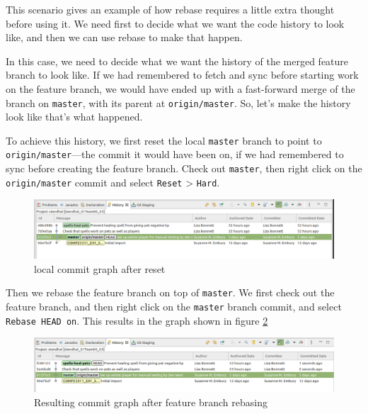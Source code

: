 \documentclass[
]{book}
\begin{document}
This scenario gives an example of how rebase requires a little extra thought before using it. We need first to decide what we want the code history to look like, and then we can use rebase to make that happen.

In this case, we need to decide what we want the history of the merged feature branch to look like. If we had remembered to fetch and sync before starting work on the feature branch, we would have ended up with a fast-forward merge of the branch on \texttt{master}, with its parent at \texttt{origin/master}. So, let's make the history look like that's what happened.

To achieve this history, we first reset the local \texttt{master} branch to point to \texttt{origin/master}---the commit it would have been on, if we had remembered to sync before creating the feature branch. Check out \texttt{master}, then right click on the \texttt{origin/master} commit and select \texttt{Reset} \textgreater{} \texttt{Hard}.

\begin{figure}

{\centering \includegraphics[width=1\linewidth]{images/localCommitGraphRebaseExampleAfterResetMasterNoHistory} 

}

\caption{local commit graph after reset}\label{fig:localCommitGraphRebaseExampleAfterResetMasterNoHistory-fig}
\end{figure}

Then we rebase the feature branch on top of \texttt{master}. We first check out the feature branch, and then right click on the \texttt{master} branch commit, and select \texttt{Rebase\ HEAD\ on}. This results in the graph shown in figure \ref{fig:localCommitGraphRebaseExampleAfterFBRebaseNoHistory-fig}

\begin{figure}

{\centering \includegraphics[width=1\linewidth]{images/localCommitGraphRebaseExampleAfterFBRebaseNoHistory} 

}

\caption{Resulting commit graph after feature branch rebasing}\label{fig:localCommitGraphRebaseExampleAfterFBRebaseNoHistory-fig}
\end{figure}
\end{document}
